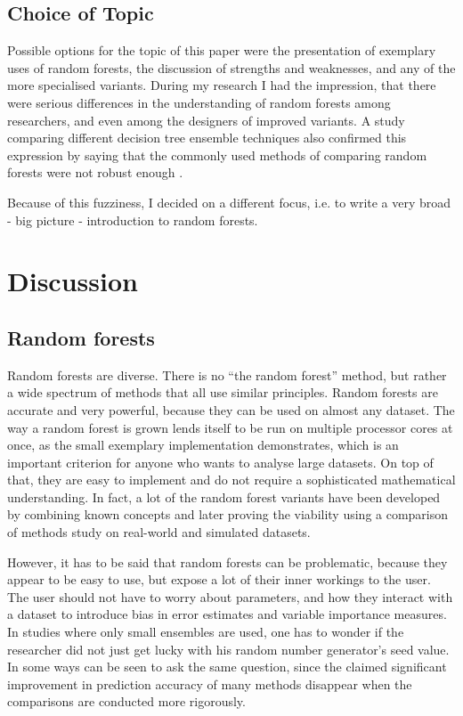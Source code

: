 \documentclass[a4paper,man,12pt,apacite,floatsintext,draftfirst]{apa6} %
\begin{document}
\subsection{Choice of Topic}
Possible options for the topic of this paper were the presentation of
exemplary uses of random
forests, the discussion of strengths and weaknesses, and any of the more
specialised variants.
During my research I had the impression, that there were serious
differences in the understanding of random forests among researchers,
and even among the designers of improved variants.
A study comparing different decision tree ensemble techniques also confirmed
this expression by saying that the commonly used methods of comparing random forests
were not robust enough \cite{banfield2007comparison}.

Because of this fuzziness, I decided on a different focus, i.e. to write
a very broad - big picture - introduction to random forests.

\newpage
\section{Discussion}
\subsection{Random forests}
Random forests are diverse.
There is no “the random forest” method, but rather a wide spectrum of
methods that all use similar principles.
Random forests are accurate and very powerful, because they can be used
on almost any dataset.
The way a random forest is grown lends itself to be run on multiple processor 
cores at once, as the
small exemplary implementation demonstrates, which is an important criterion
for anyone who wants to analyse large datasets.
On top of that, they are easy to implement and do not require a sophisticated
mathematical understanding.
In fact, a lot of the random forest variants have been developed by combining
known concepts and later proving the viability using  a comparison of methods
study on real-world and simulated datasets.

However, it has to be said that random forests can be problematic,
because they appear to be easy to use, but expose a lot of their
inner workings to the user.
The user should not have to worry about parameters, and how they interact
with a dataset to introduce bias in error estimates and
variable importance measures.
In studies where only small ensembles are used, one has to wonder if the
researcher did not just get lucky with his random number generator's seed value.
In some ways  can be seen to ask the same question,
since the claimed significant improvement in prediction accuracy of many methods
disappear when the comparisons are conducted more rigorously.
\end{document}
